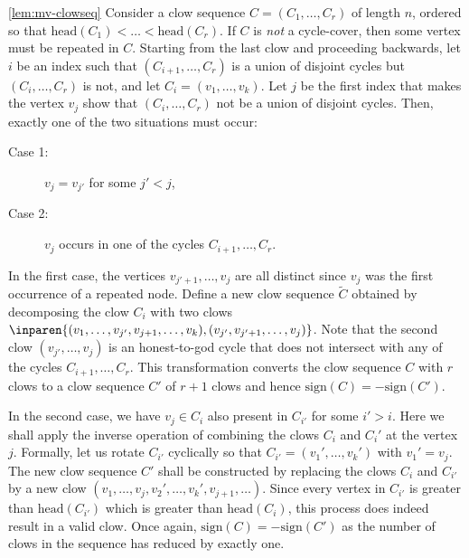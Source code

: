\begin{proofof}{\autoref{lem:mv-clowseq}}
Consider a clow sequence $C = (C_1,\dots, C_r)$ of length $n$, ordered so that $\mathrm{head}(C_1) < \dots < \mathrm{head}(C_r)$. 
If $C$ is \emph{not} a cycle-cover, then some vertex must be repeated in $C$. 
Starting from the last clow and proceeding backwards, let $i$ be an index such that $(C_{i+1},\dots, C_{r})$ is a union of disjoint cycles but $(C_{i},\dots, C_r)$ is not, and let $C_i = (v_1,\dots, v_k)$. 
Let $j$ be the first index that makes the vertex $v_{j}$ show that $(C_i,\dots, C_r)$ not be a union of disjoint cycles. 
Then, exactly one of the two situations must occur:
\begin{description}
 \item[Case 1:] $v_{j} = v_{j'}$ for some $j' < j$,

 \item[Case 2:] $v_{j}$ occurs in one of the cycles $C_{i+1},\dots, C_r$. 
\end{description}

In the first case, the vertices $v_{j'+1},\dots, v_{j}$ are all distinct since $v_j$ was the first occurrence of a repeated node. 
Define a new clow sequence  $\tilde{C}$ obtained by decomposing the clow $C_i$ with two clows $\inparen{(v_1,\dots, v_{j'},v_{j+1},\dots, v_k), (v_{j'},v_{j'+1},\dots,v_{j})}$. 
Note that the second clow $(v_{j'},\dots, v_j)$ is an honest-to-god cycle that does not intersect with any of the cycles $C_{i+1},\dots, C_r$. 
This transformation converts the clow sequence $C$ with $r$ clows to a clow sequence $C'$ of $r+1$ clows and hence $\mathrm{sign}(C) = - \mathrm{sign}(C')$. 

In the second case, we have $v_j \in C_i$ also present in $C_{i'}$ for some $i' > i$. 
Here we shall apply the inverse operation of combining the clows $C_i$ and $C_i'$ at the vertex $j$. 
Formally, let us rotate $C_{i'}$ cyclically so that $C_{i'} = (v_1',\dots, v_k')$ with $v_1' = v_j$. 
The new clow sequence $C'$ shall be constructed by replacing the clows $C_i$ and $C_{i'}$ by a new clow $(v_1,\dots, v_j, v_2',\dots, v_k', v_{j+1},\dots)$. 
Since every vertex in $C_{i'}$ is greater than $\mathrm{head}(C_{i'})$ which is greater than $\mathrm{head}(C_i)$, this process does indeed result in a valid clow. 
Once again, $\mathrm{sign}(C) = - \mathrm{sign}(C')$ as the number of clows in the sequence has reduced by exactly one.\\

\end{proofof}
